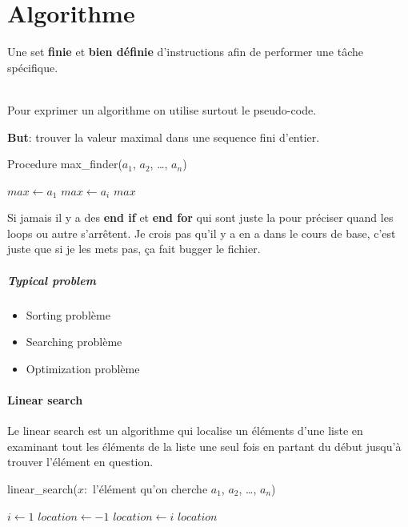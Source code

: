 \section{Algorithme}
\begin{definition}
    Une set \textbf{finie} et \textbf{bien définie} d'instructions afin de performer une tâche spécifique.
\end{definition}
\\

Pour exprimer un algorithme on utilise surtout le pseudo-code. 
\begin{exemple}
    \textbf{But}: trouver la valeur maximal dans une sequence fini d'entier.
    \begin{algorithm}
        \caption{Procedure max\_finder($a_1$, $a_2$, \dots, $a_n$)}
\begin{algorithmic}[1]    \State $max \gets a_1$
            \State $max \gets a_i$
        \EndIf
    \EndFor
    \State \Return $max$
\end{algorithmic}
            
    \end{algorithm}
\begin{framedremark}
    Si jamais il y a des \textbf{end if} et \textbf{end for} qui sont juste la pour préciser quand les loops ou autre s'arrêtent. Je crois pas qu'il y a en a dans le cours de base, c'est juste que si je les mets pas, ça fait bugger le fichier.
\end{framedremark}
\end{exemple}
\subparagraph{Typical problem}
\begin{itemize}
    \item Sorting problème
    \item Searching problème
    \item Optimization problème

\end{itemize}


\paragraph{Linear search}
\begin{definition}
    Le linear search est un algorithme qui localise un éléments d'une liste en examinant tout les éléments de la liste une seul fois en partant du début jusqu'à trouver l'élément en question.
\end{definition}
\begin{algorithm}
    \caption{linear\_search($x:$ l'élément qu'on cherche $a_1$, $a_2$, \dots, $a_n$) }
    \begin{algorithmic}
        \State $i \gets 1$
        \State $location \gets -1$
        \EndWhile
            \State $location \gets i$
        \EndIf
        \State \Return $location$
    \end{algorithmic}
\end{algorithm}

